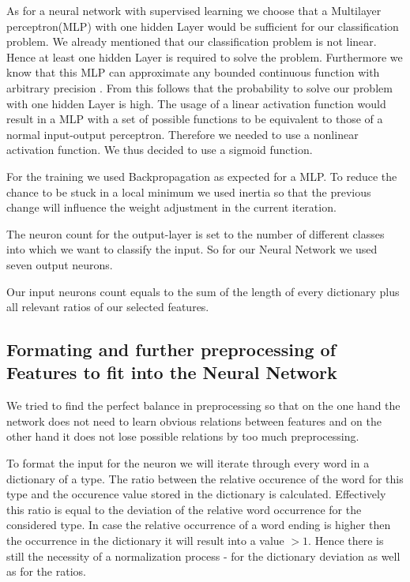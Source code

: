 \documentclass[paper=A4,pagesize=auto,12pt,headinclude=true,footinclude=true,BCOR=0mm,DIV=calc]{scrartcl}
\begin{document}
	As for a neural network with supervised learning we choose that a Multilayer perceptron(MLP) with one hidden Layer would be sufficient for our classification problem. We already mentioned that our classification problem is not linear. Hence at least one hidden Layer is required to solve the problem. Furthermore we know that this MLP can approximate any bounded continuous function with arbitrary precision \cite{ApproximateAnyFunction}. From this follows that the probability to solve our problem with one hidden Layer is high.
	The usage of a linear activation function would result in a MLP with a set of possible functions to be equivalent to those of a normal input-output perceptron. Therefore we needed to use a nonlinear activation function. We thus decided to use a sigmoid function. 
	
	For the training we used Backpropagation as expected for a MLP. To reduce the chance to be stuck in a local minimum we used inertia so that the previous change will influence the weight adjustment in the current iteration.
	
	The neuron count for the output-layer is set to the number of different classes into which we want to classify the input. So for our Neural Network we used seven output neurons.
	
	Our input neurons count equals to the sum of the length of every dictionary plus all relevant ratios of our selected features.
	
	\subsection{Formating and further preprocessing of Features to fit into the Neural Network}
	We tried to find the perfect balance in preprocessing so that on the one hand the network does not need to learn obvious relations between features and on the other hand it does not lose possible relations by too much preprocessing.
	
	To format the input for the neuron we will iterate through every word in a dictionary of a type. The ratio between the relative occurence of the word for this type and the occurence value stored in the dictionary is calculated. Effectively this ratio is equal to the deviation of the relative word occurrence for the considered type. In case the relative occurrence of a word ending is higher then the occurrence in the dictionary it will result into a value $> 1$. Hence there is still the necessity of a normalization process - for the dictionary deviation as well as for the ratios.
	
\end{document}

